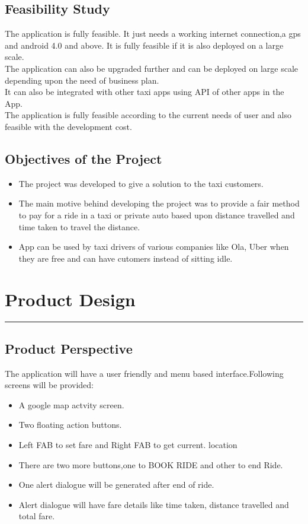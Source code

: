 \section{Feasibility Study}
The application is fully feasible. It just needs a working internet connection,a gps and android 4.0 and above. It is fully feasible if it is also deployed on a large scale.\\
The application can also be upgraded further and can be deployed on large scale depending upon the need of business plan.\\
It can also be integrated with other taxi apps using API of other apps in the App.\\
The application is fully feasible according to the current needs of user and also feasible with the development cost.
\section{Objectives of the Project }
\begin{itemize}
	\item The project was developed to give a solution to the taxi customers.
	\item The main motive behind developing the project was to provide a fair method to pay for a ride in a taxi or private auto based upon distance travelled and time taken to travel the distance.
	\item App can be used by taxi drivers of various companies like Ola, Uber when they are free and can have cutomers instead of sitting idle.
\end{itemize}


\chapter{Product Design}\hrule
\label{Chapter:3}

\section{Product Perspective}
The application will have a user friendly and menu based interface.Following screens will be provided:
\begin{itemize}
	\item A google map actvity screen.
	\item Two floating action buttons.
	\item Left FAB to set fare and Right FAB to get current. location
	\item There are two more buttons,one to BOOK RIDE and other to end Ride.
	\item One alert dialogue will be generated after end of ride.
	\item Alert dialogue will have fare details like time taken, distance travelled and total fare.
\end{itemize}
